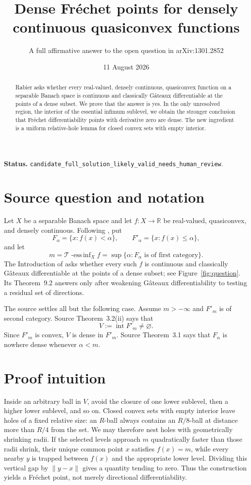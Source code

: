 \documentclass[11pt]{article}
\title{Dense Fr\'echet points for densely continuous quasiconvex functions}
\author{A full affirmative answer to the open question in arXiv:1301.2852}
\date{11 August 2026}
\newcommand{\R}{\mathbb R}
\begin{document}
\maketitle

\noindent\textbf{Status.}
\texttt{candidate\_full\_solution\_likely\_valid\_needs\_human\_review}.

\begin{abstract}
Rabier asks whether every real-valued, densely continuous, quasiconvex
function on a separable Banach space is continuous and classically
G\^ateaux differentiable at the points of a dense subset. We prove that the
answer is yes. In the only unresolved region, the interior of the essential
infimum sublevel, we obtain the stronger conclusion that Fr\'echet
differentiability points with derivative zero are dense. The new ingredient
is a uniform relative-hole lemma for closed convex sets with empty interior.
\end{abstract}

\section{Source question and notation}

Let \(X\) be a separable Banach space and let \(f:X\to\R\) be real-valued,
quasiconvex, and densely continuous. Following \cite{source}, put
\[
 F_\alpha=\{x:f(x)<\alpha\},\qquad
 F'_\alpha=\{x:f(x)\le\alpha\},
\]
and let
\[
 m=\mathcal T\operatorname{-ess\,inf}_X f
 =\sup\{\alpha:F_\alpha\text{ is of first category}\}.
\]
The Introduction of \cite{source} asks whether every such \(f\) is continuous
and classically G\^ateaux differentiable at the points of a dense subset;
see Figure~\ref{fig:question}. Its Theorem~9.2 answers only after weakening
G\^ateaux differentiability to testing a residual set of directions.

The source settles all but the following case. Assume \(m>-\infty\) and
\(F'_m\) is of second category. Source Theorem~3.2(ii) says that
\[
 V:=\operatorname{int}F'_m\ne\varnothing.
\]
Since \(F'_m\) is convex, \(V\) is dense in \(F'_m\). Source Theorem~3.1 says
that \(F_\alpha\) is nowhere dense whenever \(\alpha<m\).

\section{Proof intuition}

Inside an arbitrary ball in \(V\), avoid the closure of one lower sublevel,
then a higher lower sublevel, and so on. Closed convex sets with empty
interior leave holes of a fixed relative size: an \(R\)-ball always contains
an \(R/8\)-ball at distance more than \(R/4\) from the set. We may therefore
nest holes with geometrically shrinking radii. If the selected levels
approach \(m\) quadratically faster than those radii shrink, their unique
common point \(x\) satisfies \(f(x)=m\), while every nearby \(y\) is trapped
between \(f(x)\) and the appropriate lower level. Dividing this vertical gap
by \(\|y-x\|\) gives a quantity tending to zero. Thus the construction yields
a Fr\'echet point, not merely directional differentiability.
\end{document}
